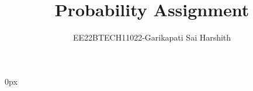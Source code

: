 \documentclass[journal,11pt,twocolumn]{IEEEtran}
\DeclareMathOperator*{\Res}{Res}
\begin{document}
\parindent 0px
\newtheorem{theorem}{Theorem}[section]
\newtheorem{problem}{Problem}
\newtheorem{proposition}{Proposition}[section]
\newtheorem{lemma}{Lemma}[section]
\newtheorem{corollary}[theorem]{Corollary}
\newtheorem{example}{Example}[section]
\newtheorem{definition}[problem]{Definition}
\newcommand{\BEQA}{\begin{eqnarray}}
\newcommand{\EEQA}{\end{eqnarray}}
\newcommand{\define}{\stackrel{\triangle}{=}}

\providecommand{\mbf}{\mathbf}
\providecommand{\pr}[1]{\ensuremath{\Pr\left(#1\right)}}
\providecommand{\qfunc}[1]{\ensuremath{Q\left(#1\right)}}
\providecommand{\sbrak}[1]{\ensuremath{{}\left[#1\right]}}
\providecommand{\lsbrak}[1]{\ensuremath{{}\left[#1\right.}}
\providecommand{\rsbrak}[1]{\ensuremath{{}\left.#1\right]}}
\providecommand{\brak}[1]{\ensuremath{\left(#1\right)}}
\providecommand{\lbrak}[1]{\ensuremath{\left(#1\right.}}
\providecommand{\rbrak}[1]{\ensuremath{\left.#1\right)}}
\providecommand{\cbrak}[1]{\ensuremath{\left\{#1\right\}}}
\providecommand{\lcbrak}[1]{\ensuremath{\left\{#1\right.}}
\providecommand{\rcbrak}[1]{\ensuremath{\left.#1\right\}}}
\theoremstyle{remark}
\newtheorem{rem}{Remark}
\newcommand{\sgn}{\mathop{\mathrm{sgn}}}
\providecommand{\abs}[1]{\left\vert#1\right\vert}
\providecommand{\res}[1]{\Res\displaylimits_{#1}} 
\providecommand{\norm}[1]{\left\lVert#1\right\rVert}
\providecommand{\mtx}[1]{\mathbf{#1}}
\providecommand{\mean}[1]{E\left[ #1 \right]}
\providecommand{\fourier}{\overset{\mathcal{F}}{ \rightleftharpoons}}
\providecommand{\system}[1]{\overset{\mathcal{#1}}{ \longleftrightarrow}}
\newcommand{\solution}{\noindent \textbf{Solution: }}
\newcommand{\cosec}{\,\text{cosec}\,}
\providecommand{\dec}[2]{\ensuremath{\overset{#1}{\underset{#2}{\gtrless}}}}
\newcommand{\myvec}[1]{\ensuremath{\begin{pmatrix}#1\end{pmatrix}}}
\newcommand{\mydet}[1]{\ensuremath{\begin{vmatrix}#1\end{vmatrix}}}
\let\vec\mathbf
\def\putbox#1#2#3{\makebox[0in][l]{\makebox[#1][l]{}\raisebox{\baselineskip}[0in][0in]{\raisebox{#2}[0in][0in]{#3}}}}
     \def\rightbox#1{\makebox[0in][r]{#1}}
     \def\centbox#1{\makebox[0in]{#1}}
     \def\topbox#1{\raisebox{-\baselineskip}[0in][0in]{#1}}
     \def\midbox#1{\raisebox{-0.5\baselineskip}[0in][0in]{#1}}

\vspace{3cm}
\title{Probability Assignment}
\author{EE22BTECH11022-Garikapati Sai Harshith}
\maketitle
\bigskip
\end{document}
